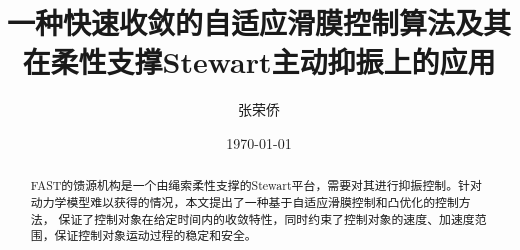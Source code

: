 \documentclass[lang=cn,11pt,a4paper]{elegantpaper}
\title{一种快速收敛的自适应滑膜控制算法及其在柔性支撑Stewart主动抑振上的应用}
\author{张荣侨}
\institute{清华大学机械工程系}
\date{\today}
\begin{document}
\maketitle

\begin{abstract}
FAST的馈源机构是一个由绳索柔性支撑的Stewart平台，需要对其进行抑振控制。针对动力学模型难以获得的情况，本文提出了一种基于自适应滑膜控制和凸优化的控制方法，
保证了控制对象在给定时间内的收敛特性，同时约束了控制对象的速度、加速度范围，保证控制对象运动过程的稳定和安全。
\end{abstract}















\end{document}
